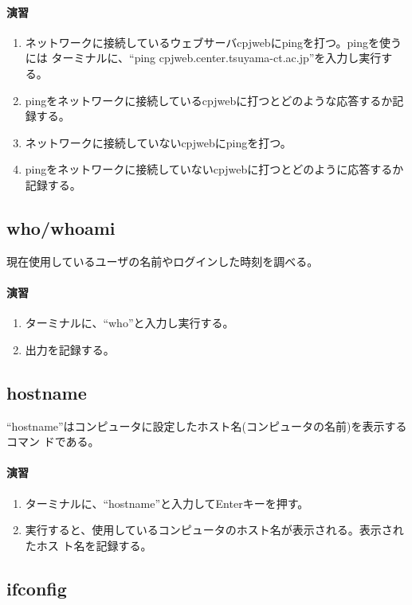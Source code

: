 \paragraph{演習}
\begin{enumerate}
\item ネットワークに接続しているウェブサーバcpjwebにpingを打つ。pingを使うには
      ターミナルに、``ping cpjweb.center.tsuyama-ct.ac.jp''を入力し実行する。
\item pingをネットワークに接続しているcpjwebに打つとどのような応答するか記録する。
\item ネットワークに接続していないcpjwebにpingを打つ。
\item pingをネットワークに接続していないcpjwebに打つとどのように応答するか記録する。
\end{enumerate}

\subsection{who/whoami}
現在使用しているユーザの名前やログインした時刻を調べる。

\paragraph{演習}
\begin{enumerate}
\item ターミナルに、``who''と入力し実行する。
\item 出力を記録する。
\end{enumerate}

\subsection{hostname}

``hostname''はコンピュータに設定したホスト名(コンピュータの名前)を表示するコマン
ドである。

\paragraph{演習}
\begin{enumerate}
\item ターミナルに、``hostname''と入力してEnterキーを押す。
\item 実行すると、使用しているコンピュータのホスト名が表示される。表示されたホス
      ト名を記録する。
\end{enumerate}

\subsection{ifconfig}

